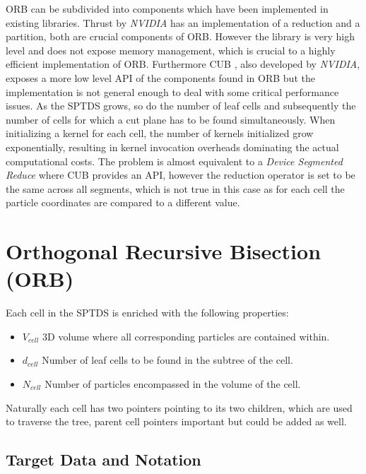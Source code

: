 \documentclass[]{article}
\begin{document}
ORB can be subdivided into components which have been implemented in existing libraries.
Thrust by \textit{NVIDIA} \cite{thrust} has an implementation of a reduction and a partition, both are crucial components of ORB. However the library is very high level and does not expose memory management, which is crucial to a highly efficient implementation of ORB. 
Furthermore CUB \cite{cub}, also developed by \textit{NVIDIA}, exposes a more low level API of the components found in ORB but the implementation is not general enough to deal with some critical performance issues. As the SPTDS grows, so do the number of leaf cells and subsequently the number of cells for which a cut plane has to be found simultaneously. When initializing a kernel for each cell, the number of kernels initialized grow exponentially, resulting in kernel invocation overheads dominating the actual computational costs. The problem is almost equivalent to a \textit{Device Segmented Reduce} \cite{cubSeg} where CUB provides an API, however the reduction operator is set to be the same across all segments, which is not true in this case as for each cell the particle coordinates are compared to a different value. 


\newpage

\newpage
\section{Orthogonal Recursive Bisection (ORB)} \label{section:orb}


Each cell in the SPTDS is enriched with the following properties:

\begin{itemize}
	\item \textbf{$V_{cell}$} 3D volume where all corresponding particles are contained within.
	\item \textbf{$d_{cell}$} Number of leaf cells to be found in the subtree of the cell.
	\item \textbf{$N_{cell}$} Number of particles encompassed in the volume of the cell. 
\end{itemize}

Naturally each cell has two pointers pointing to its two children, which are used to traverse the tree, parent cell pointers important but could be added as well.


\subsection{Target Data and Notation}\label{sec:target-data}
\end{document}
